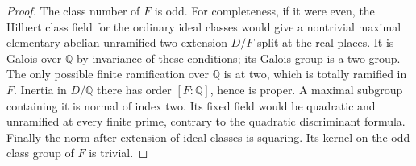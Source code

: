 \documentclass[a4paper,11pt]{article}
\theoremstyle{definition}
\theoremstyle{remark}
\numberwithin{equation}{section}
\begin{document}
\begin{proof}
The class number of \(F\) is odd. For completeness, if it were even,
the Hilbert class field for the ordinary ideal classes would give a
nontrivial maximal elementary abelian unramified two-extension
\(D/F\) split at the real places. It is Galois over \(\mathbb Q\)
by invariance of these conditions; its Galois group is a two-group.
The only possible finite ramification over \(\mathbb Q\) is at two,
which is totally ramified in \(F\). Inertia in \(D/\mathbb Q\)
there has order \([F:\mathbb Q]\), hence is proper. A maximal
subgroup containing it is normal of index two. Its fixed field
would be quadratic and unramified at every finite prime, contrary
to the quadratic discriminant formula. Finally the norm after
extension of ideal classes is squaring. Its kernel on the odd
class group of \(F\) is trivial.
\end{proof}
\end{document}
